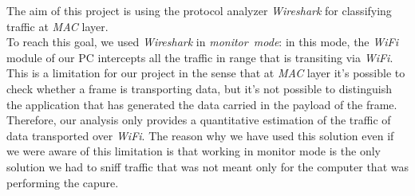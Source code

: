 The aim of this project is using the protocol analyzer \textit{Wireshark} for classifying traffic at \textit{MAC} layer.\\ 
To reach this goal, we used \textit{Wireshark} in \textit{monitor\ mode}: in this mode, the \textit{WiFi} module of our PC
intercepts all the traffic in range that is transiting via \textit{WiFi}.\\ 
This is a limitation for our project in the sense that at \textit{MAC} layer it's possible to check whether a frame is transporting data, but it's 
not possible to distinguish the application that has generated the data carried in the payload of the frame. Therefore, our 
analysis only provides a quantitative estimation of the traffic of data transported over \textit{WiFi}. The reason why we have 
used this solution even if we were aware of this limitation is that working in monitor mode is the only solution we had
to sniff traffic that was not meant only for the computer that was performing the capure.\\

